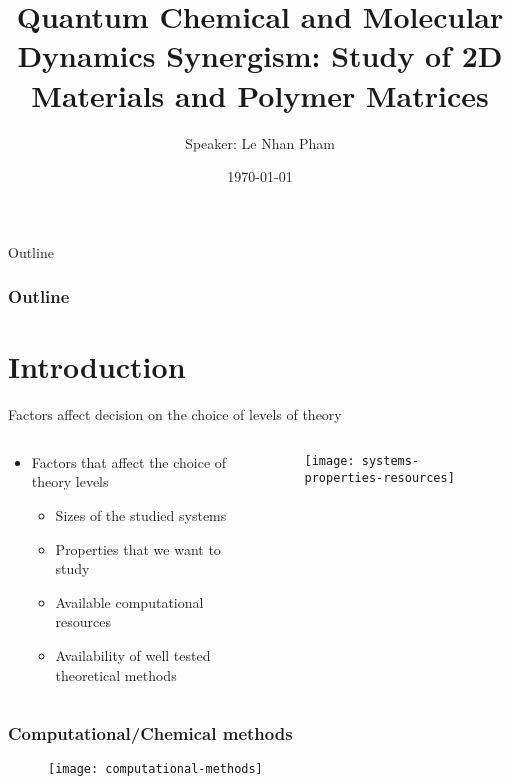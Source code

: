 \documentclass[xcolor=table,aspectratio=169]{beamer}
\title{Quantum Chemical and Molecular Dynamics Synergism: Study of 2D Materials and Polymer Matrices}
\subtitle{}
\author{Speaker: Le Nhan Pham}
\institute{College of Science and Engineering - Flinders Uni - Australia}
\date{\today}
\begin{document}
\begin{frame}
	\titlepage
\end{frame}





\begin{frame}{Outline} %
	\frametitle{Outline}
	\tableofcontents
\end{frame}


\linespread{1.5}



\section{Introduction}

\begin{frame}{Factors affect decision on the choice of levels of theory}
	\begin{columns}
		\begin{column}{0.55\textwidth}
			\begin{itemize}
				\item Factors that affect the choice of theory levels
				      \begin{itemize}
					      \item Sizes of the studied systems
					      \item Properties that we want to study
					      \item Available computational resources
					      \item Availability of well tested theoretical methods
				      \end{itemize}
			\end{itemize}
		\end{column}
		\begin{column}{0.45\textwidth}
			\begin{figure}
				\centering
				\texttt{[image: systems-properties-resources]}
			\end{figure}
		\end{column}
	\end{columns}
\end{frame}


\begin{frame}
	\frametitle{Computational/Chemical methods}
	\begin{figure}
		\centering
		\texttt{[image: computational-methods]}
	\end{figure}
\end{frame}
\end{document}
